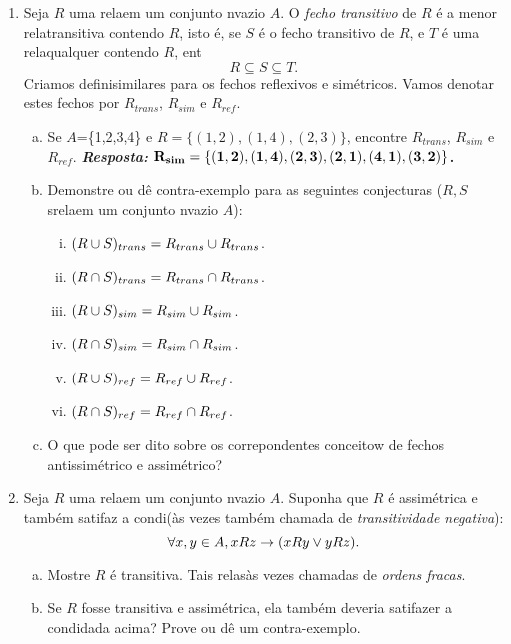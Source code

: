 \begin{enumerate}[{\bf 1.}]
\item Seja $R$ uma rela\cao em um conjunto n\ao vazio $A$. O {\it fecho transitivo} de $R$ \'e a menor rela\cao transitiva contendo $R$, isto \'e, se $S$ \'e o fecho transitivo de $R$, e $T$ \'e uma rela\cao qualquer contendo $R$, ent\ao
\[
R\subseteq S\subseteq T.
\]
Criamos defini\coes similares para os fechos reflexivos e sim\'etricos. Vamos denotar estes fechos por $R_{trans}$, $R_{sim}$ e $R_{ref}$. 
\begin{enumerate}[a)]
\item Se $A$=\{1,2,3,4\} e $R=\{(1,2),(1,4),(2,3)\}$, encontre $R_{trans}$, $R_{sim}$ e $R_{ref}$. {\bf{\it Resposta:} ${\bf R_{sim}=\{(1,2),(1,4),(2,3),(2,1),(4,1),(3,2)\}}$.}
\item Demonstre ou d\^e contra-exemplo para as seguintes conjecturas ($R,S$ s\ao rela\coes em um conjunto n\ao vazio $A$):
\begin{enumerate}[i)]
\item $(R\cup S)_{trans}=R_{trans}\cup R_{trans}$.
\item $(R\cap S)_{trans}=R_{trans}\cap R_{trans}$.
\item $(R\cup S)_{sim}=R_{sim}\cup R_{sim}$.
\item $(R\cap S)_{sim}=R_{sim}\cap R_{sim}$.
\item $(R\cup S)_{ref}=R_{ref}\cup R_{ref}$.
\item $(R\cap S)_{ref}=R_{ref}\cap R_{ref}$.
\end{enumerate}
\item O que pode ser dito sobre os correpondentes conceitow de fechos antissim\'etrico e assim\'etrico?
\end{enumerate}

\item Seja $R$ uma rela\cao em um conjunto n\ao vazio $A$. Suponha que $R$ \'e assim\'etrica e tamb\'em satifaz a condi\cao (\`as vezes tamb\'em chamada de {\it transitividade negativa}):
\[
\forall x,y\in A, xRz\to (xRy\vee yRz).
\]
\begin{enumerate}[a)]
\item Mostre $R$ \'e transitiva. Tais rela\coes s\ao \`as vezes chamadas de {\it ordens fracas}. 
\item Se $R$ fosse transitiva e assim\'etrica, ela tamb\'em deveria satifazer a condi\cao dada acima? Prove ou d\^e um contra-exemplo.
\end{enumerate}



\end{enumerate}
